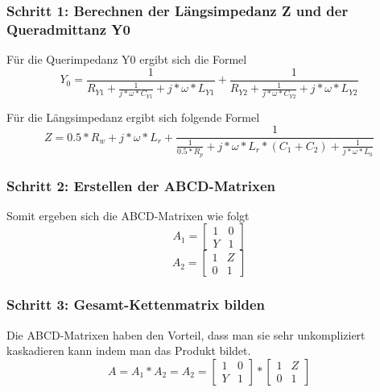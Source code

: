\subsubsection{Schritt 1: Berechnen der Längsimpedanz Z und der Queradmittanz Y0}\label{subsubsec:schritt1}
Für die Querimpedanz Y0 ergibt sich die Formel
\begin{equation}\label{y_admittance}
Y_0 = \frac{ 1 }{R_{Y1} + \frac{1}{j*\omega*C_{Y1}}+j*\omega*L_{Y1}} +\frac{ 1 }{R_{Y2} + \frac{1}{j*\omega*C_{Y2}}+j*\omega*L_{Y2}}
\end{equation}

Für die Längsimpedanz ergibt sich folgende Formel
\begin{equation}\label{z_impedance}
Z = 0.5*R_w+j*\omega*L_r+\frac{ 1 }{ \frac{1}{0.5*R_p}+j*\omega*L_r*(C_1+C_2)+\frac{1}{j*\omega*L_0} }
\end{equation}

\subsubsection{Schritt 2: Erstellen der ABCD-Matrixen}\label{subsubsec:schritt2}

Somit ergeben sich die ABCD-Matrixen wie folgt
\begin{equation}\label{equ:abcd_a1}
A_1 =
\left[\begin{matrix}
1 & 0\\ Y&1 
\end{matrix}\right]
\end{equation}
\begin{equation}\label{equ:abcd_a2}
A_2 =
\left[\begin{matrix}
1 & Z\\ 0&1 
\end{matrix}\right]
\end{equation}

\subsubsection{Schritt 3: Gesamt-Kettenmatrix bilden}\label{subsubsec:schritt3}
Die ABCD-Matrixen haben den Vorteil, dass man sie sehr unkompliziert kaskadieren kann indem man das Produkt bildet.
\begin{equation}
A = A_1*A_2 = A_2 = \left[\begin{matrix}
1 & 0\\ Y&1 
\end{matrix}\right] * 
\left[\begin{matrix}
1 & Z\\ 0&1 
\end{matrix} \right]
\end{equation}

